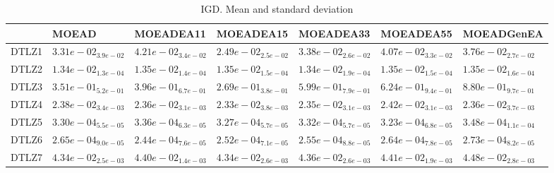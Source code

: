 \documentclass{article}
\begin{document}
\begin{table}
\caption{IGD. Mean and standard deviation}
\label{table:mean.IGD}
\centering
\begin{scriptsize}
\begin{tabular}{lllllll}
\hline & MOEAD & MOEADEA11 & MOEADEA15 & MOEADEA33 & MOEADEA55 &  MOEADGenEA\\
\hline
DTLZ1 & \cellcolor{gray25}$  3.31e-02_{ 3.9e-02}$ & $  4.21e-02_{ 3.4e-02}$ & \cellcolor{gray95}$  2.49e-02_{ 2.5e-02}$ & $  3.38e-02_{ 2.6e-02}$ & $  4.07e-02_{ 3.3e-02}$ & $  3.76e-02_{ 2.7e-02}$ \\
DTLZ2 & \cellcolor{gray25}$  1.34e-02_{ 1.3e-04}$ & $  1.35e-02_{ 1.4e-04}$ & $  1.35e-02_{ 1.5e-04}$ & \cellcolor{gray95}$  1.34e-02_{ 1.9e-04}$ & $  1.35e-02_{ 1.5e-04}$ & $  1.35e-02_{ 1.6e-04}$ \\
DTLZ3 & \cellcolor{gray25}$  3.51e-01_{ 5.2e-01}$ & $  3.96e-01_{ 6.7e-01}$ & \cellcolor{gray95}$  2.69e-01_{ 3.8e-01}$ & $  5.99e-01_{ 7.9e-01}$ & $  6.24e-01_{ 9.4e-01}$ & $  8.80e-01_{ 9.7e-01}$ \\
DTLZ4 & $  2.38e-02_{ 3.4e-03}$ & $  2.36e-02_{ 3.1e-03}$ & \cellcolor{gray95}$  2.33e-02_{ 3.8e-03}$ & \cellcolor{gray25}$  2.35e-02_{ 3.1e-03}$ & $  2.42e-02_{ 3.1e-03}$ & $  2.36e-02_{ 3.7e-03}$ \\
DTLZ5 & $  3.30e-04_{ 5.5e-05}$ & $  3.36e-04_{ 6.3e-05}$ & \cellcolor{gray25}$  3.27e-04_{ 5.7e-05}$ & $  3.32e-04_{ 5.7e-05}$ & \cellcolor{gray95}$  3.23e-04_{ 6.8e-05}$ & $  3.48e-04_{ 1.1e-04}$ \\
DTLZ6 & $  2.65e-04_{ 9.0e-05}$ & \cellcolor{gray95}$  2.44e-04_{ 7.6e-05}$ & \cellcolor{gray25}$  2.52e-04_{ 7.1e-05}$ & $  2.55e-04_{ 8.8e-05}$ & $  2.64e-04_{ 7.8e-05}$ & $  2.73e-04_{ 8.2e-05}$ \\
DTLZ7 & \cellcolor{gray95}$  4.34e-02_{ 2.5e-03}$ & $  4.40e-02_{ 1.4e-03}$ & \cellcolor{gray25}$  4.34e-02_{ 2.6e-03}$ & $  4.36e-02_{ 2.6e-03}$ & $  4.41e-02_{ 1.9e-03}$ & $  4.48e-02_{ 2.8e-03}$ \\
\hline
\end{tabular}
\end{scriptsize}
\end{table}
\
\end{document}
